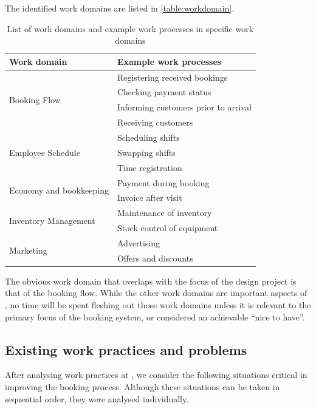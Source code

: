 The identified work domains are listed in \autoref{table:workdomain}.

\begin{table}[H]
    \centering
\begin{tabular}{|l|l|}
        \hline
        Work domain & Example work processes \\ \hline
        \multirow{4}{*}{Booking Flow} 
            & Registering received bookings \\
            & Checking payment status \\
            & Informing customers prior to arrival \\
            & Receiving customers \\
        \hline
        \multirow{3}{*}{Employee Schedule} 
            & Scheduling shifts \\
            & Swapping shifts \\
            & Time registration \\
        \hline
        \multirow{2}{*}{Economy and bookkeeping} 
            & Payment during booking \\
            & Invoice after visit \\
        \hline
        \multirow{2}{*}{Inventory Management} 
            & Maintenance of inventory \\
            & Stock control of equipment \\
        \hline
        \multirow{2}{*}{Marketing} 
            & Advertising \\
            & Offers and discounts \\
        \hline
\end{tabular}
\caption{List of work domains and example work processes in specific work domains}
\label{table:workdomain}
\end{table}

The obvious work domain that overlaps with the focus of the design project is
that of the booking flow. While the other work domains are important aspects of
\gomonkey{}, no time will be spent fleshing out those work domains unless it is
relevant to the primary focus of the booking system, or considered an achievable
``nice to have''.

\subsection{Existing work practices and problems}
After analysing work practices at \gomonkey, we consider the following situations 
critical in improving the booking process. Although these situations can be taken
in sequential order, they were analysed individually.


